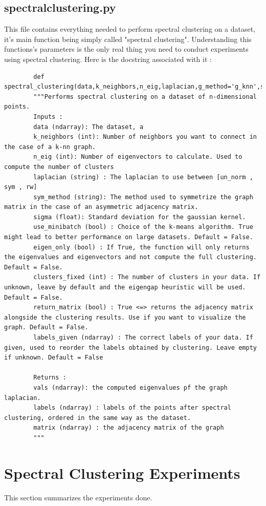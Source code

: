 \documentclass[a4paper,12pt]{article}
\theoremstyle{definition}
\theoremstyle{plain}
\begin{document}
	\subsection{spectralclustering.py}
	This file contains everything needed to perform spectral clustering on a dataset, it's main function being simply called "spectral clustering".
	Understanding this functions's parameters is the only real thing you need to conduct experiments using spectral clustering. Here is the docstring associated with it :
	\begin{lstlisting}
		def spectral_clustering(data,k_neighbors,n_eig,laplacian,g_method='g_knn',sym_method='mean',sigma=None,use_minibatch=False,eigen_only=False,clusters_fixed=False,return_matrix=False,labels_given=np.array([None])):
		"""Performs spectral clustering on a dataset of n-dimensional points.
		Inputs :
		data (ndarray): The dataset, a 
		k_neighbors (int): Number of neighbors you want to connect in the case of a k-nn graph.
		n_eig (int): Number of eigenvectors to calculate. Used to compute the number of clusters
		laplacian (string) : The laplacian to use between [un_norm , sym , rw] 
		sym_method (string): The method used to symmetrize the graph matrix in the case of an asymmetric adjacency matrix.
		sigma (float): Standard deviation for the gaussian kernel.
		use_minibatch (bool) : Choice of the k-means algorithm. True might lead to better performance on large datasets. Default = False.
		eigen_only (bool) : If True, the function will only returns the eigenvalues and eigenvectors and not compute the full clustering. Default = False.
		clusters_fixed (int) : The number of clusters in your data. If unknown, leave by default and the eigengap heuristic will be used. Default = False.
		return_matrix (bool) : True <=> returns the adjacency matrix alongside the clustering results. Use if you want to visualize the graph. Default = False.
		labels_given (ndarray) : The correct labels of your data. If given, used to reorder the labels obtained by clustering. Leave empty if unknown. Default = False 

		Returns :
		vals (ndarray): the computed eigenvalues pf the graph laplacian.
		labels (ndarray) : labels of the points after spectral clustering, ordered in the same way as the dataset.
		matrix (ndarray) : the adjacency matrix of the graph
		"""
	\end{lstlisting}

	
\section{Spectral Clustering Experiments}
This section summarizes the experiments done.
\end{document}
